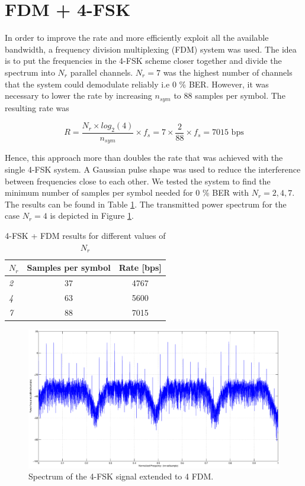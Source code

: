 \documentclass[12pt,a4paper,openright]{report}
\begin{document}
\section{FDM + 4-FSK}


In order to improve the rate and more efficiently exploit all the available bandwidth, a frequency division multiplexing (FDM) system was used. The idea is to put the frequencies in the 4-FSK scheme closer together and divide the spectrum into \(N_r\) parallel channels. \(N_r = 7\) was the highest number of channels that the system could demodulate reliably i.e 0 \% BER. However, it was necessary to lower the rate by increasing \(n_{sym}\) to 88 samples per symbol. The resulting rate was

$$ R = \frac{N_r\times log_2(4)}{n_{sym}}\times f_s = 7 \times \frac{2}{88}\times f_s =7015 \text{ bps}$$


Hence, this approach more than doubles the rate that was achieved with the single 4-FSK system. A Gaussian pulse shape was used to reduce the interference between frequencies close to each other. We tested the system to find the minimum number of samples per symbol needed for 0 \% BER with \(N_r=2,4,7\).
The results can be found in Table \ref{table:FDM}. The transmitted power spectrum for the case \(N_r= 4\) is depicted in Figure \ref{fig:4FSKFDM}.

\begin{table} [h]
\centering
\begin{tabular}{lcc} 
\(N_r\)	&  Samples per symbol  & Rate \textnormal{[bps]} \\
\hline
\emph{2}        & 37           & 4767           \\
\emph{4}        & 63           & 5600           \\
\emph{7}        & 88           & 7015           \\
\end{tabular}
\caption[Result of 4-FSK + FDM]{4-FSK + FDM results for different values of \(N_r\)}
\label{table:FDM}
\end{table}


\begin{figure}[H]
  \centering
    \includegraphics[width=1.0\textwidth]{4FDMspectrum.eps}
    \caption[4-FSK spectrum]{Spectrum of the 4-FSK signal extended to 4 FDM.}
    \label{fig:4FSKFDM}
\end{figure}
\end{document}
